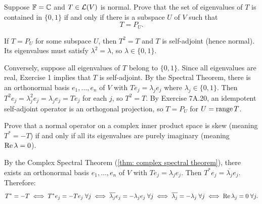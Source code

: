 \begin{xrcs}
  Suppose $\mathbb{F} = \mathbb{C}$ and $T \in \mathcal{L}(V)$ is normal. Prove that the set of eigenvalues of $T$ is contained in $\{0, 1\}$ if and only if there is a subspace $U$ of $V$ such that
  \begin{equation}
    T = P_U.
  \end{equation}

\begin{xprf}
  \Leftarrowdirection If $T = P_U$ for some subspace $U$, then $T^2 = T$ and $T$ is self-adjoint (hence normal). Its eigenvalues must satisfy $\lambda^2 = \lambda$, so $\lambda \in \{0, 1\}$.

  \Rightarrowdirection Conversely, suppose all eigenvalues of $T$ belong to $\{0, 1\}$.
  Since all eigenvalues are real, Exercise 1 implies that $T$ is self-adjoint.
  By the Spectral Theorem, there is an orthonormal basis $e_1, \dots, e_n$ of $V$ with $T e_j = \lambda_j e_j$ where $\lambda_j \in \{0, 1\}$.
  Then $T^2 e_j = \lambda_j^2 e_j = \lambda_j e_j = T e_j$ for each $j$, so $T^2 = T$.
  By Exercise 7A.20, an idempotent self-adjoint operator is an orthogonal projection, so $T = P_U$ for $U = \operatorname{range} T$.
\end{xprf}
\end{xrcs}

\begin{xrcs}
  Prove that a normal operator on a complex inner product space is skew (meaning $T^* = -T$) if and only if all its eigenvalues are purely imaginary (meaning $\operatorname{Re} \lambda = 0$).

\begin{xprf}
  By the Complex Spectral Theorem (\ref{thm: complex spectral theorem}), there exists an orthonormal basis $e_1, \dots, e_n$ of $V$ with $T e_j = \lambda_j e_j$.
  Then $T^* e_j = \overline{\lambda_j} e_j$.
  Therefore:
  \[
    T^* = -T \iff T^* e_j = -T e_j \;\forall j \iff \overline{\lambda_j} e_j = -\lambda_j e_j \;\forall j \iff \overline{\lambda_j} = -\lambda_j \;\forall j \iff \operatorname{Re} \lambda_j = 0 \;\forall j.
  \]
\end{xprf}
\end{xrcs}

